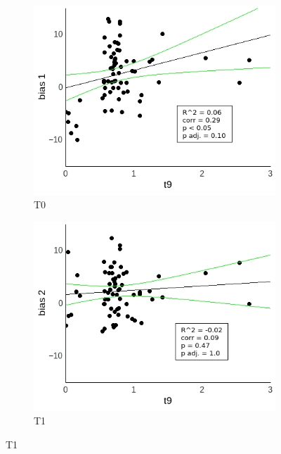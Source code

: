 \documentclass[a4paper]{scrreprt}
\begin{document}
\begin{figure}
\centering
\begin{subfigure}[b]{0.49\textwidth}
        \includegraphics[width=\textwidth]{figs/sec3/t9/t9_diff_1_mod2mod2.jpeg}
        \caption{T0}
    \end{subfigure}
    \begin{subfigure}[b]{0.49\textwidth}
        \includegraphics[width=\textwidth]{figs/sec3/t9/t9_diff_2_mod2mod2.jpeg}
        \caption{T1}
    \end{subfigure}


\end{figure}
\end{document}
